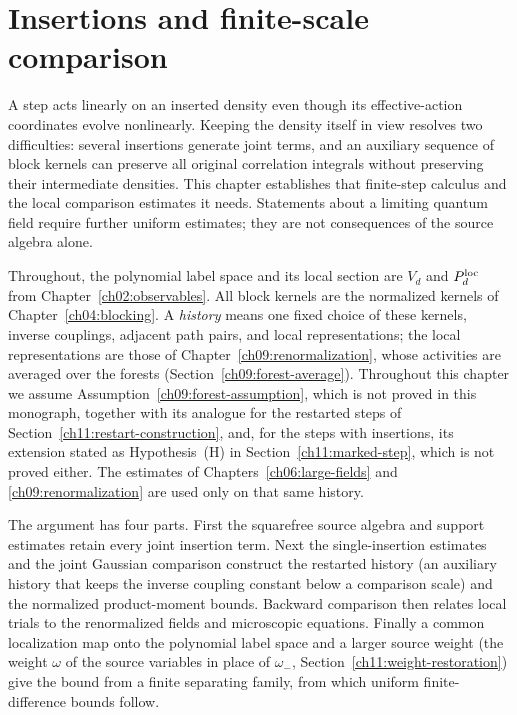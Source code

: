 \chapter{Insertions and finite-scale comparison}
\label{ch11:insertions}

A step acts linearly on an inserted density even though
its effective-action coordinates evolve nonlinearly. Keeping the density
itself in view resolves two difficulties: several insertions generate
joint terms, and an auxiliary sequence of block kernels can preserve
all original correlation integrals without preserving their intermediate
densities. This chapter establishes that finite-step calculus and the
local comparison estimates it needs. Statements about a limiting quantum
field require further uniform estimates; they are not consequences of
the source algebra alone.

Throughout, the polynomial label space and its local section are
$V_d$ and $P_d^{\rm loc}$ from Chapter~\ref{ch02:observables}.
All block kernels are the normalized kernels of
Chapter~\ref{ch04:blocking}. A \emph{history} means one fixed choice of these
kernels, inverse couplings, adjacent path pairs, and local representations; the local representations are those of Chapter~\ref{ch09:renormalization}, whose activities are averaged over the forests (Section~\ref{ch09:forest-average}). Throughout this chapter we assume Assumption~\ref{ch09:forest-assumption}, which is not proved in this monograph, together with its analogue for the restarted steps of Section~\ref{ch11:restart-construction}, and, for the steps with insertions, its extension stated as Hypothesis~(H) in Section~\ref{ch11:marked-step}, which is not proved either.
The estimates of Chapters~\ref{ch06:large-fields} and
\ref{ch09:renormalization} are used only on that same history.

The argument has four parts. First the squarefree source algebra
and support estimates retain every joint insertion term. Next the
single-insertion estimates and the joint Gaussian comparison construct
the restarted history (an auxiliary history that keeps the inverse coupling constant below a comparison scale) and the normalized product-moment bounds.
Backward comparison then relates local trials to the
renormalized fields and microscopic equations. Finally a common
localization map onto the polynomial label space and a larger source weight (the weight $\omega$ of the source variables in place of $\omega_-$, Section~\ref{ch11:weight-restoration}) give the bound from a finite separating family, from which uniform finite-difference bounds follow.

